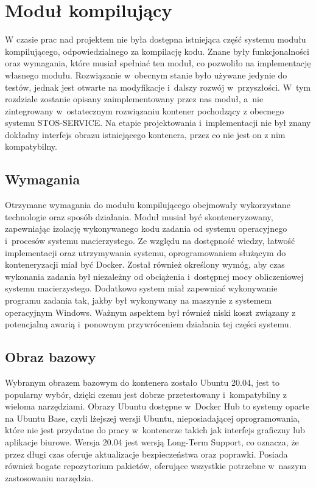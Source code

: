 \section{Moduł kompilujący}
W czasie prac nad projektem nie była dostępna istniejąca część systemu modułu kompilującego, odpowiedzialnego za kompilację kodu. Znane były funkcjonalności oraz wymagania, które musiał spełniać ten moduł, co pozwoliło na implementację własnego modułu. Rozwiązanie w~obecnym stanie było używane jedynie do testów, jednak jest otwarte na modyfikacje i~dalszy rozwój w~przyszłości. W~tym rozdziale zostanie opisany zaimplementowany przez nas moduł, a~nie zintegrowany w~ostatecznym rozwiązaniu kontener pochodzący z obecnego systemu STOS-SERVICE. Na etapie projektowania i~implementacji nie był znany dokładny interfejs obrazu istniejącego kontenera, przez co nie jest on z nim kompatybilny. 

\subsection{Wymagania}
Otrzymane wymagania do modułu kompilującego obejmowały wykorzystane technologie oraz sposób działania. Moduł musiał być skonteneryzowany, zapewniając izolację wykonywanego kodu zadania od systemu operacyjnego i~procesów systemu macierzystego. Ze względu na dostępność wiedzy, łatwość implementacji oraz utrzymywania systemu, oprogramowaniem służącym do konteneryzacji miał być Docker. Został również określony wymóg, aby czas wykonania zadania był niezależny od obciążenia i~dostępnej mocy obliczeniowej systemu macierzystego. Dodatkowo system miał zapewniać wykonywanie programu zadania tak, jakby był wykonywany na maszynie z systemem operacyjnym Windows. Ważnym aspektem był również niski koszt związany z potencjalną awarią i~ponownym przywróceniem działania tej części systemu.

\subsection{Obraz bazowy}
Wybranym obrazem bazowym do kontenera zostało Ubuntu 20.04\cite{linuxUbuntu}, jest to popularny wybór, dzięki czemu jest dobrze przetestowany i~kompatybilny z wieloma narzędziami. Obrazy Ubuntu dostępne w~Docker Hub to systemy oparte na Ubuntu Base, czyli lżejszej wersji Ubuntu, nieposiadającej oprogramowania, które nie jest przydatne do pracy w~kontenerze takich jak interfejs graficzny lub aplikacje biurowe. Wersja 20.04 jest wersją Long-Term Support, co oznacza, że przez długi czas oferuje aktualizacje bezpieczeństwa oraz poprawki. Posiada również bogate repozytorium pakietów, oferujące wszystkie potrzebne w~naszym zastosowaniu narzędzia.

